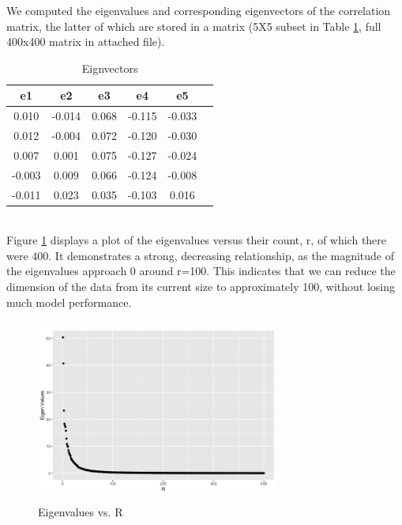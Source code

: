\documentclass{homework}
\begin{document}
We computed the eigenvalues and corresponding eigenvectors of the correlation matrix, the latter of which are stored in a matrix (5X5 subset in Table \ref{tab:EIG}, full 400x400 matrix in attached file).
\begin{table}[h]
    \centering
    \begin{tabular}{cccccc}
  e1&e2&e3&e4&e5\\
  \hline
  0.010&-0.014&0.068&-0.115&-0.033\\
  0.012&-0.004&0.072&-0.120&-0.030\\
  0.007&0.001&0.075&-0.127&-0.024\\
 -0.003&0.009&0.066&-0.124&-0.008\\
 -0.011&0.023&0.035&-0.103&0.016
    \end{tabular}
    \caption{Eignvectors}
    \label{tab:EIG}
\end{table}
\\Figure \ref{fig:EIG} displays a plot of the eigenvalues versus their count, r, of which there were 400. It demonstrates a strong, decreasing relationship, as the magnitude of the eigenvalues approach 0 around r=100. This indicates that we can reduce the dimension of the data from its current size to approximately 100, without losing much model performance.
\begin{figure}[h]
    \centering
    \includegraphics[width=8cm,height=6cm]{graphs/EIGEN.png}
    \caption{Eigenvalues vs. R}
    \label{fig:EIG}
\end{figure}
\end{document}
